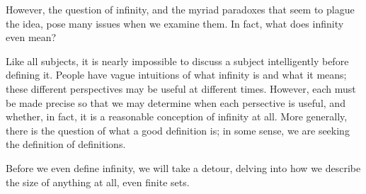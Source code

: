 However, the question of infinity, and the myriad paradoxes that seem to plague the idea, pose many issues when we examine them.
In fact, what does infinity even mean?

Like all subjects, it is nearly impossible to discuss a subject intelligently before defining it.
People have vague intuitions of what infinity is and what it means; these different perspectives may be useful at different times.
However, each must be made precise so that we may determine when each persective is useful, and whether, in fact, it is a reasonable conception of infinity at all.
More generally, there is the question of what a good definition is; in some sense, we are seeking the definition of definitions.

Before we even define infinity, we will take a detour, delving into how we describe the size of anything at all, even finite sets.

